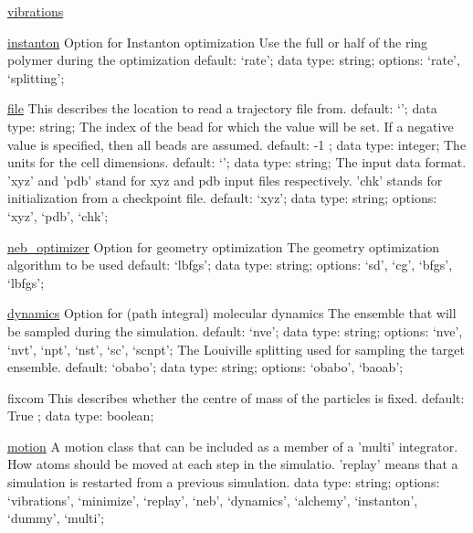 \begin{ipifield}{}
\begin{ipifield}{\hyperref[PHONONS]{vibrations}}
{}
\end{ipifield}
\begin{ipifield}{\hyperref[INSTANTON]{instanton}}%
{Option for Instanton optimization}%
{}%
{%
{Use the full or half of the ring polymer during the optimization}%
{default: `rate'; data type: string; options: `rate', `splitting'; }%
}
\end{ipifield}
\begin{ipifield}{\hyperref[INITFILE]{file}}%
{This describes the location to read a trajectory file from.}%
{default: `'; data type: string; }%
{%
{The index of the bead for which the value will be set. If a negative value is specified, then all beads are assumed.}%
{default:  -1 ; data type: integer; }%
%
{The units for the cell dimensions.}%
{default: `'; data type: string; }%
%
{The input data format. 'xyz' and 'pdb' stand for xyz and pdb input files respectively. 'chk' stands for initialization from a checkpoint file.}%
{default: `xyz'; data type: string; options: `xyz', `pdb', `chk'; }%
}
\end{ipifield}
\begin{ipifield}{\hyperref[NEB]{neb\_optimizer}}%
{Option for geometry optimization}%
{}%
{%
{The geometry optimization algorithm to be used}%
{default: `lbfgs'; data type: string; options: `sd', `cg', `bfgs', `lbfgs'; }%
}
\end{ipifield}
\begin{ipifield}{\hyperref[DYNAMICS]{dynamics}}%
{Option for (path integral) molecular dynamics}%
{}%
{%
{The ensemble that will be sampled during the simulation. }%
{default: `nve'; data type: string; options: `nve', `nvt', `npt', `nst', `sc', `scnpt'; }%
%
{The Louiville splitting used for sampling the target ensemble. }%
{default: `obabo'; data type: string; options: `obabo', `baoab'; }%
}
\end{ipifield}
\begin{ipifield}{fixcom}%
{This describes whether the centre of mass of the particles is fixed.}%
{default:  True ; data type: boolean; }%
{}
\end{ipifield}
\begin{ipifield}{\hyperref[MOTION]{motion}}%
{A motion class that can be included as a member of a 'multi' integrator.}%
{}%
{%
{How atoms should be moved at each step in the simulatio. 'replay' means that a simulation is restarted from a previous simulation.}%
{data type: string; options: `vibrations', `minimize', `replay', `neb', `dynamics', `alchemy', `instanton', `dummy', `multi'; }%
}
\end{ipifield}
\end{ipifield}
